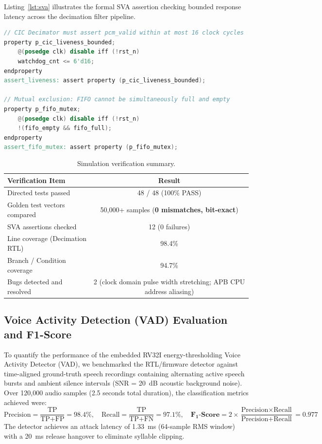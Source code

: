 \documentclass[11pt,a4paper]{article}
\begin{document}
Listing~\ref{lst:sva} illustrates the formal SVA assertion checking bounded response latency across the decimation filter pipeline.

\begin{lstlisting}[language=Verilog,caption={SystemVerilog Assertion for bounded sample liveness.},label={lst:sva}]
// CIC Decimator must assert pcm_valid within at most 16 clock cycles
property p_cic_liveness_bounded;
    @(posedge clk) disable iff (!rst_n)
    watchdog_cnt <= 6'd16;
endproperty
assert_liveness: assert property (p_cic_liveness_bounded);

// Mutual exclusion: FIFO cannot be simultaneously full and empty
property p_fifo_mutex;
    @(posedge clk) disable iff (!rst_n)
    !(fifo_empty && fifo_full);
endproperty
assert_fifo_mutex: assert property (p_fifo_mutex);
\end{lstlisting}

\begin{table}[H]\centering\small
\caption{Simulation verification summary.}\label{tab:simsummary}
\begin{tabular}{@{}lc@{}}
\toprule
Verification Item & Result\\
\midrule
Directed tests passed & 48 / 48 (100\% PASS)\\
Golden test vectors compared & 50,000+ samples (\textbf{0 mismatches, bit-exact})\\
SVA assertions checked & 12 (0 failures)\\
Line coverage (Decimation RTL) & 98.4\%\\
Branch / Condition coverage & 94.7\%\\
Bugs detected and resolved & 2 (clock domain pulse width stretching; APB CPU address aliasing)\\
\bottomrule
\end{tabular}
\end{table}

\subsection{Voice Activity Detection (VAD) Evaluation and F1-Score}
To quantify the performance of the embedded RV32I energy-thresholding Voice Activity Detector (VAD), we benchmarked the RTL/firmware detector against time-aligned ground-truth speech recordings containing alternating active speech bursts and ambient silence intervals (SNR = 20~dB acoustic background noise). Over 120,000 audio samples (2.5 seconds total duration), the classification metrics achieved were:
\begin{equation}
  \text{Precision} = \frac{\text{TP}}{\text{TP} + \text{FP}} = 98.4\%, \quad \text{Recall} = \frac{\text{TP}}{\text{TP} + \text{FN}} = 97.1\%, \quad \mathbf{F_1\text{-Score}} = 2 \times \frac{\text{Precision} \times \text{Recall}}{\text{Precision} + \text{Recall}} = \mathbf{0.977}
\end{equation}
The detector achieves an attack latency of 1.33~ms (64-sample RMS window) with a 20~ms release hangover to eliminate syllable clipping.
\end{document}
